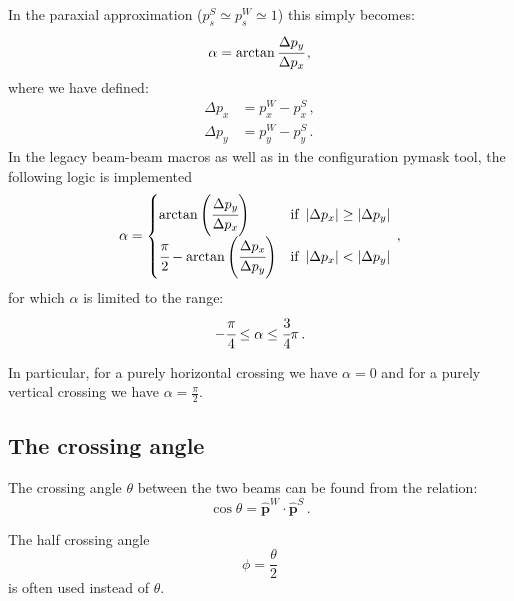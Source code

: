 In the paraxial approximation ($p^S_{s} \simeq p^W_{s}\simeq 1$) this simply becomes:
\begin{equation}
    \alpha=\arctan \cfrac
    {\Delta p_y}
    {\Delta p_x}
    \, ,
    \label{eq:alpha1}
\end{equation}
where we have defined:
\begin{align}
    \Delta p_x &= p_x^W - p_x^S \, ,\\
    \Delta p_y &= p_y^W - p_y^S \, .
\end{align}
In the legacy beam-beam macros as well as in the configuration pymask tool, the following logic is implemented
\begin{equation}
    \alpha = \begin{cases} 
    \arctan \left(\cfrac
    {\Delta p_y}
    {\Delta p_x}\right) &\mbox{if } \left|\Delta p_x\right| \geq \left|\Delta p_y\right| \\ 
    \cfrac{\pi}{2} - \arctan \left(\cfrac
    {\Delta p_x}
    {\Delta p_y}
    \right)&\mbox{if } \left|\Delta p_x\right| < \left|\Delta p_y\right| \end{cases}
    \, ,
\end{equation}
for which $\alpha$ is limited to the range:
\begin{equation}
     -\cfrac{\pi}{4}  \leq \alpha \leq \cfrac{3}{4}\pi
     \, .
\end{equation}

In particular, for a purely horizontal crossing we have $\alpha=0$ and for a purely vertical crossing we have $\alpha=\frac{\pi}{2}$.

\subsection{The crossing angle}
The crossing angle $\theta$ between the two beams can be found from the relation:
\begin{equation}
\cos\theta=\hat{\textbf{p}}^W\cdot
\hat{\textbf{p}}^S
\, .
\label{eq:dotprod}
\end{equation}

The half crossing angle 
\begin{equation}
    \phi = \frac{\theta}{2}
\end{equation}
is often used instead of $\theta$.

